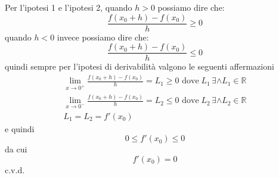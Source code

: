 \documentclass[../../analisi1]{subfiles}
\begin{document}
                Per l'ipotesi 1 e l'ipotesi 2, quando \(h>0\) possiamo dire che:
                \[ \frac{f(x_0 + h) - f(x_0)}{h}  \geqslant 0\]
                quando \(h<0\) invece possiamo dire che:
                \[ \frac{f(x_0 + h) - f(x_0)}{h}  \leqslant 0\]
                quindi sempre per l'ipotesi di derivabilità valgono le seguenti affermazioni
                \begin{gather*}
                    \lim_{x\to 0^+} \frac{f(x_0 + h) - f(x_0)}{h} = L_1 \geqslant 0 \text{ dove} \; L_1 \, \exists \land L_1 \in \mathbb{R}\\
                    \lim_{x\to 0^-} \frac{f(x_0 + h) - f(x_0)}{h} = L_2  \leqslant 0 \text{ dove} \; L_2 \, \exists \land L_2 \in \mathbb{R}\\
                    L_1 = L_2 = f'(x_0)
                \end{gather*}
                e quindi
                \[0 \leqslant f'(x_0) \leqslant 0\]
                da cui
                \[f'(x_0)=0\]
                c.v.d.
\end{document}
